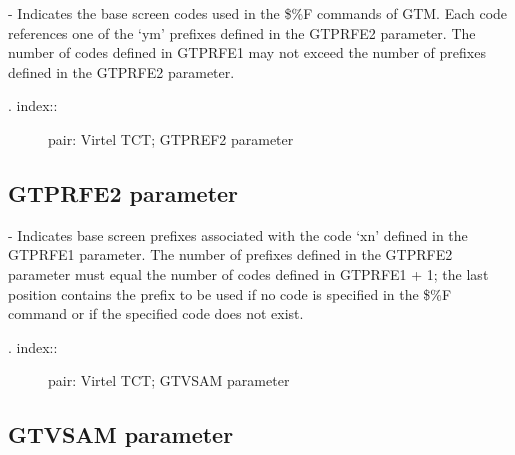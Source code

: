 \documentclass[letterpaper,10pt,english]{sphinxmanual}
\begin{document}
 - Indicates the base screen codes used in the \$\%F commands of GTM. Each code references one of the ‘ym’ prefixes defined in the GTPRFE2 parameter. The number of codes defined in GTPRFE1 may not exceed the number of prefixes defined in the GTPRFE2 parameter.
\begin{description}
\item[{. index::}] \leavevmode
pair: Virtel TCT; GTPREF2 parameter

\end{description}


\subsection{GTPRFE2 parameter}
\label{\detokenize{Installation_Guide:gtprfe2-parameter}}
\begin{sphinxVerbatim}[commandchars=\\\{\}]
     
\end{sphinxVerbatim}

 - Indicates base screen prefixes associated with the code ‘xn’ defined in the GTPRFE1 parameter. The number of prefixes defined in the GTPRFE2 parameter must equal the number of codes defined in GTPRFE1 + 1; the last position contains the prefix to be used if no code is specified in the \$\%F command or if the specified code does not exist.
\begin{description}
\item[{. index::}] \leavevmode
pair: Virtel TCT; GTVSAM parameter

\end{description}


\subsection{GTVSAM parameter}
\label{\detokenize{Installation_Guide:gtvsam-parameter}}
\begin{sphinxVerbatim}[commandchars=\\\{\}]
       
\end{sphinxVerbatim}
\end{document}
